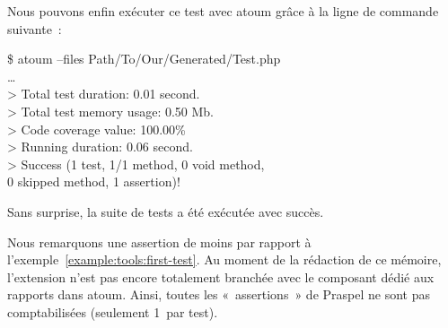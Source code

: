 \begin{example}
\noindent Nous pouvons enfin exécuter ce test avec atoum grâce à la ligne de
commande suivante~:
%
\begin{pre}
\$ atoum --files Path/To/Our/Generated/Test.php \\
… \\
> Total test duration: 0.01 second. \\
> Total test memory usage: 0.50 Mb. \\
> Code coverage value: 100.00\% \\
> Running duration: 0.06 second. \\
> Success (1 test, 1/1 method, 0 void method, \\
           0 skipped method, 1 assertion)!
\end{pre}
%
Sans surprise, la suite de tests a été exécutée avec succès.

Nous remarquons une assertion de moins par rapport à
l'exemple~\ref{example:tools:first-test}.  Au moment de la rédaction de ce
mémoire, l'extension n'est pas encore totalement branchée avec le composant
dédié aux rapports dans atoum. Ainsi, toutes les «~assertions~» de Praspel ne
sont pas comptabilisées (seulement 1~par test).

\end{example}
